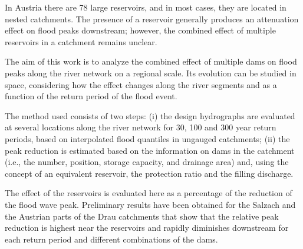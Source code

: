 \noindent

In Austria there are 78 large reservoirs, and in most cases, they are located in nested catchments. The presence of a reservoir generally produces an attenuation effect on flood peaks downstream; however, the combined effect of multiple reservoirs in a catchment remains unclear. 

The aim of this work is to analyze the combined effect of multiple dams on flood peaks along the river network on a regional scale. Its evolution can be studied in space, considering how the effect changes along the river segments and as a function of the return period of the flood event.

The method used consists of two steps: (i) the design hydrographs are evaluated at several locations along the river network for 30, 100 and 300 year return periods, based on interpolated flood quantiles in ungauged catchments; (ii) the peak reduction is estimated based on the information on dams in the catchment (i.e., the number, position, storage capacity, and drainage area) and, using the concept of an equivalent reservoir, the protection ratio and the filling discharge. 

The effect of the reservoirs is evaluated here as a percentage of the reduction of the flood wave peak. Preliminary results have been obtained for the Salzach and the Austrian parts of the Drau catchments that show that the relative peak reduction is highest near the reservoirs and rapidly diminishes downstream for each return period and different combinations of the dams. 
\newpage{}
{}
\begin{flushleft}





\end{flushleft}

